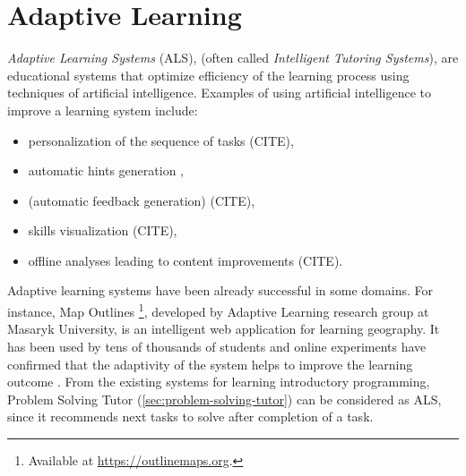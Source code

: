 \chapter{Adaptive Learning}
\label{chap:adaptive-learning}

\emph{Adaptive Learning Systems} (ALS),
(often called \emph{Intelligent Tutoring Systems}), \cite{its-overview}
are educational systems that optimize efficiency of the learning process
using techniques of artificial intelligence.
Examples of using artificial intelligence to improve a learning system include:
\begin{itemize}
\item personalization of the sequence of tasks (CITE), %
\item automatic hints generation \cite{generating-hints},
\item (automatic feedback generation) (CITE),
\item skills visualization (CITE),
\item offline analyses leading to content improvements (CITE). %
\end{itemize}


Adaptive learning systems have been already successful in some domains.
For instance, Map Outlines%
  \footnote{Available at \url{https://outlinemaps.org}.},
  developed by Adaptive Learning research group at Masaryk University,
  is an intelligent web application for learning geography.
It has been used by tens of thousands of students
  and online experiments have confirmed
  that the adaptivity of the system helps to improve the learning outcome
  \cite{alg.evaluation-geography}.
From the existing systems for learning introductory programming,
Problem Solving Tutor (\cref{sec:problem-solving-tutor}) can be considered
as ALS, since it recommends next tasks to solve after completion of a task.

